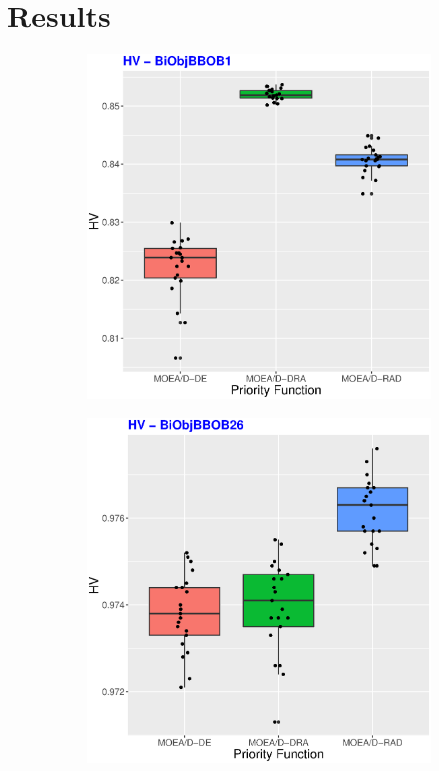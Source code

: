 \section{Results}



\begin{figure}[!t]
	\centering
	\begin{subfigure}[b]{0.33\textwidth}
		\centering
		\includegraphics[width=1\textwidth, height=1\textwidth]{img/BiObjBBOB1_HV.eps}
	\end{subfigure}
	\begin{subfigure}[b]{0.33\textwidth}
		\centering
		\includegraphics[width=1\textwidth, height=1\textwidth]{img/BiObjBBOB26_HV.eps}

\end{subfigure}
\end{figure}
